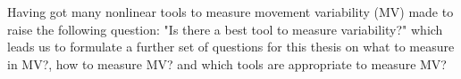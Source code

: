 %
%
%


Having got many nonlinear tools to measure movement variability (MV) 
made \citealt[p. 67]{caballero2014} to raise the following question: 
"Is there a best tool to measure variability?" which leads us to 
formulate a further set of questions for this thesis on 
what to measure in MV?, how to measure MV? 
and which tools are appropriate to measure MV?

